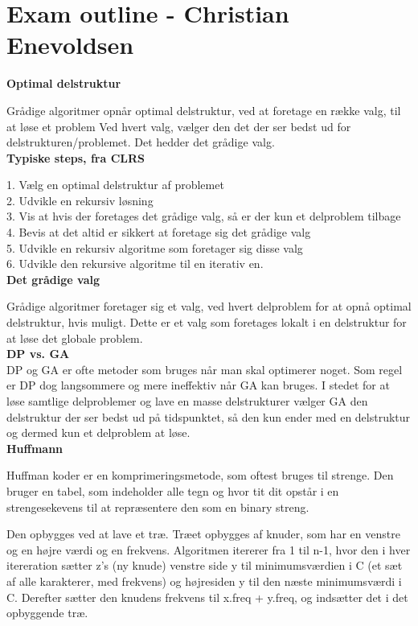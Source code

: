 \documentclass[12pt]{article}
\begin{document}
\section*{Exam outline - Christian Enevoldsen}
\textbf{Optimal delstruktur}

Grådige algoritmer opnår optimal delstruktur, ved at foretage en række valg, til at løse et problem
Ved hvert valg, vælger den det der ser bedst ud for delstrukturen/problemet. Det hedder det grådige valg.\\

\textbf{Typiske steps, fra CLRS}

1. Vælg en optimal delstruktur af problemet\\
2. Udvikle en rekursiv løsning\\
3. Vis at hvis der foretages det grådige valg, så er der kun et delproblem tilbage\\
4. Bevis at det altid er sikkert at foretage sig det grådige valg\\
5. Udvikle en rekursiv algoritme som foretager sig disse valg\\
6. Udvikle den rekursive algoritme til en iterativ en.\\

\textbf{Det grådige valg}

Grådige algoritmer foretager sig et valg, ved hvert delproblem for at opnå optimal delstruktur, hvis muligt.
Dette er et valg som foretages lokalt i en delstruktur for at løse det globale problem.\\

\textbf{DP vs. GA}\\

DP og GA er ofte metoder som bruges når man skal optimerer noget. Som regel er DP dog langsommere og mere ineffektiv når GA kan bruges. I stedet for at løse samtlige delproblemer og lave en masse delstrukturer vælger GA den delstruktur der ser bedst ud på tidspunktet, så den kun ender med en delstruktur og dermed kun et delproblem at løse.\\

\textbf{Huffmann}

Huffman koder er en komprimeringsmetode, som oftest bruges til strenge. 
Den bruger en tabel, som indeholder alle tegn og hvor tit dit opstår i en strengesekevens til at repræsentere den som en binary streng. 

Den opbygges ved at lave et træ. Træet opbygges af knuder, som har en venstre og en højre værdi og en frekvens. Algoritmen itererer fra 1 til n-1, hvor den i hver itereration sætter z's (ny knude) venstre side y til minimumsværdien i C (et sæt af alle karakterer, med frekvens) og højresiden y til den næste minimumsværdi i C. Derefter sætter den knudens frekvens til x.freq + y.freq, og indsætter det i det opbyggende træ.
\end{document}
